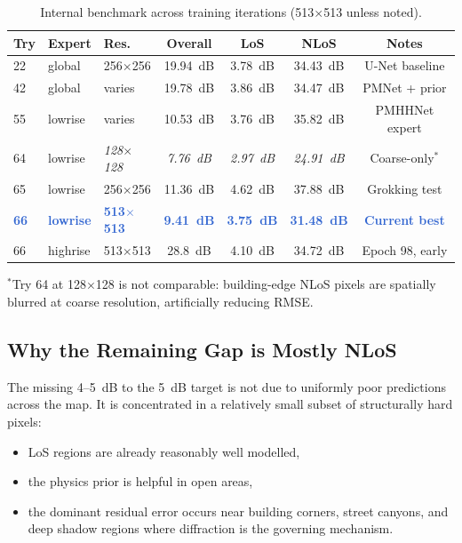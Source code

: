 \documentclass[11pt,a4paper]{article}
\newcommand{\ours}[1]{\textcolor{highlight}{\textbf{#1}}}
\begin{document}
\begin{table}[h!]
\centering
\caption{Internal benchmark across training iterations (513$\times$513 unless noted).}
\label{tab:progress}
\begin{tabular}{lllcccc}
\toprule
\textbf{Try} & \textbf{Expert} & \textbf{Res.} & \textbf{Overall} & \textbf{LoS} & \textbf{NLoS} & \textbf{Notes} \\
\midrule
22 & global & 256$\times$256 & 19.94~dB & 3.78~dB & 34.43~dB & U-Net baseline \\
42 & global & varies & 19.78~dB & 3.86~dB & 34.47~dB & PMNet + prior \\
55 & lowrise & varies & 10.53~dB & 3.76~dB & 35.82~dB & PMHHNet expert \\
64 & lowrise & \textit{128$\times$128} & \textit{7.76~dB} & \textit{2.97~dB} & \textit{24.91~dB} & Coarse-only$^*$ \\
65 & lowrise & 256$\times$256 & 11.36~dB & 4.62~dB & 37.88~dB & Grokking test \\
\midrule
\ours{66} & \ours{lowrise} & \ours{513$\times$513} & \ours{9.41~dB} & \ours{3.75~dB} & \ours{31.48~dB} & \ours{Current best} \\
66 & highrise & 513$\times$513 & 28.8~dB & 4.10~dB & 34.72~dB & Epoch 98, early \\
\bottomrule
\end{tabular}
\vspace{0.3em}
\footnotesize $^*$Try 64 at 128$\times$128 is not comparable: building-edge NLoS pixels
are spatially blurred at coarse resolution, artificially reducing RMSE.
\end{table}

\subsection{Why the Remaining Gap is Mostly NLoS}

The missing 4--5~dB to the 5~dB target is not due to uniformly poor predictions
across the map. It is concentrated in a relatively small subset of structurally
hard pixels:
\begin{itemize}[nosep]
    \item LoS regions are already reasonably well modelled,
    \item the physics prior is helpful in open areas,
    \item the dominant residual error occurs near building corners, street canyons,
          and deep shadow regions where diffraction is the governing mechanism.
\end{itemize}
\end{document}
